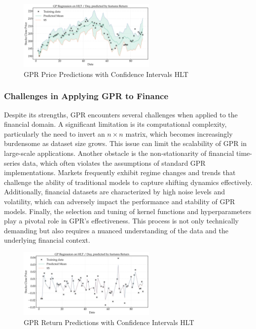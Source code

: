 \begin{figure}[h]
    \centering
    \includegraphics[width=0.6\textwidth]{figures/future_predictions_HLT.png}
    \caption{GPR Price Predictions with Confidence Intervals HLT}
    \label{fig:gpr_predictions_HLT_price}
\end{figure}

\subsubsection{Challenges in Applying GPR to Finance}
Despite its strengths, \ac{GPR} encounters several challenges when applied to the financial domain. A significant limitation is its computational complexity, particularly the need to invert an $n \times n$ matrix, which becomes increasingly burdensome as dataset size grows. This issue can limit the scalability of \ac{GPR} in large-scale applications. 
Another obstacle is the non-stationarity of financial time-series data, which often violates the assumptions of standard \ac{GPR} implementations. Markets frequently exhibit regime changes and trends that challenge the ability of traditional models to capture shifting dynamics effectively. 
Additionally, financial datasets are characterized by high noise levels and volatility, which can adversely impact the performance and stability of \ac{GPR} models. 
Finally, the selection and tuning of kernel functions and hyperparameters play a pivotal role in \ac{GPR}'s effectiveness. This process is not only technically demanding but also requires a nuanced understanding of the data and the underlying financial context.

\begin{figure}[htbp]
    \centering
    \includegraphics[width=0.6\textwidth]{figures/future_predictions_HLT_return.png}
    \caption{GPR Return Predictions with Confidence Intervals HLT}
    \label{fig:gpr_predictions_HLT}
\end{figure}


